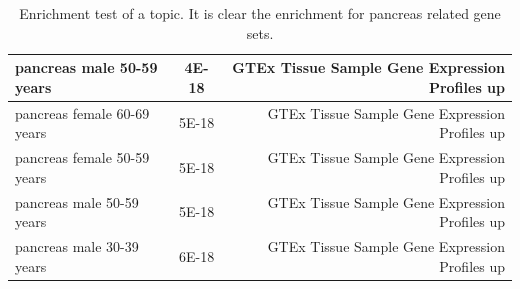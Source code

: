 \begin{table}[htb!]
\begin{center}
\begin{tabular}{|l|c|r|}
			pancreas male 50-59 years & 4E-18 & GTEx Tissue Sample Gene Expression Profiles up \\ \hline
			pancreas female 60-69 years & 5E-18 & GTEx Tissue Sample Gene Expression Profiles up \\ \hline
			pancreas female 50-59 years & 5E-18 & GTEx Tissue Sample Gene Expression Profiles up \\ \hline
			pancreas male 50-59 years & 5E-18 & GTEx Tissue Sample Gene Expression Profiles up \\ \hline
			pancreas male 30-39 years & 6E-18 & GTEx Tissue Sample Gene Expression Profiles up \\ \hline
		\end{tabular}
	\end{center}
	\caption{Enrichment test of a topic. It is clear the enrichment for pancreas related gene sets.}
	\label{tab:topic/enrich/pancreas}
\end{table}
